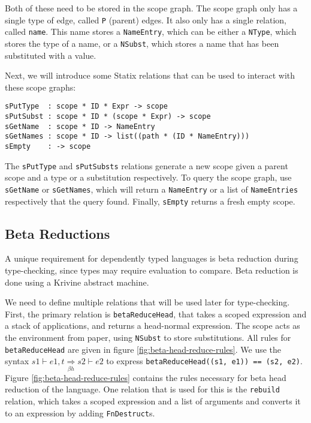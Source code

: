 \documentclass[a4paper,UKenglish,cleveref, autoref, thm-restate]{oasics-v2021}
\newcommand{\bhr}{\underset{\beta h}{\Rightarrow}}
\begin{document}
Both of these need to be stored in the scope graph. The scope graph only has a single type of edge, called \verb|P| (parent) edges. It also only has a single relation, called \verb|name|. This name stores a \verb|NameEntry|, which can be either a \verb|NType|, which stores the type of a name, or a \verb|NSubst|, which stores a name that has been substituted with a value. 

Next, we will introduce some Statix relations that can be used to interact with these scope graphs:

\begin{lstlisting}
sPutType  : scope * ID * Expr -> scope
sPutSubst : scope * ID * (scope * Expr) -> scope
sGetName  : scope * ID -> NameEntry
sGetNames : scope * ID -> list((path * (ID * NameEntry)))
sEmpty    : -> scope
\end{lstlisting}
The \verb|sPutType| and \verb|sPutSubsts| relations generate a new scope given a parent scope and a type or a substitution respectively. To query the scope graph, use \verb|sGetName| or \verb|sGetNames|, which will return a \verb|NameEntry| or a list of \verb|NameEntries| respectively that the query found. Finally, \verb|sEmpty| returns a fresh empty scope.

\newpage
\subsection{Beta Reductions}

A unique requirement for dependently typed languages is beta reduction during type-checking, since types may require evaluation to compare. Beta reduction is done using a Krivine abstract machine\cite{krivine}. 

We need to define multiple relations that will be used later for type-checking. First, the primary relation is \verb|betaReduceHead|, that takes a scoped expression and a stack of applications, and returns a head-normal expression. The scope acts as the environment from \cite{krivine} paper, using \verb|NSubst| to store substitutions. All rules for \verb|betaReduceHead| are given in figure \ref{fig:beta-head-reduce-rules}. We use the syntax $s1 \vdash e1, t \bhr s2 \vdash e2$ to express \verb|betaReduceHead((s1, e1)) == (s2, e2)|. Figure \ref{fig:beta-head-reduce-rules} contains the rules necessary for beta head reduction of the language. One relation that is used for this is the \verb|rebuild| relation, which takes a scoped expression and a list of arguments and converts it to an expression by adding \verb|FnDestruct|s.
\end{document}
